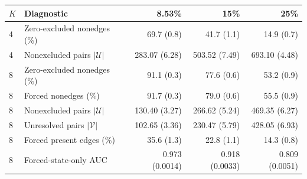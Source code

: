 \begin{tabular}{llrrr}
\toprule
$K$ & Diagnostic & 8.53\% & 15\% & 25\% \\
\midrule
4 & Zero-excluded nonedges (\%) & 69.7 (0.8) & 41.7 (1.1) & 14.9 (0.7) \\
4 & Nonexcluded pairs $|\mathcal U|$ & 283.07 (6.28) & 503.52 (7.49) & 693.10 (4.48) \\
\midrule
8 & Zero-excluded nonedges (\%) & 91.1 (0.3) & 77.6 (0.6) & 53.2 (0.9) \\
8 & Forced nonedges (\%) & 91.7 (0.3) & 79.0 (0.6) & 55.5 (0.9) \\
8 & Nonexcluded pairs $|\mathcal U|$ & 130.40 (3.27) & 266.62 (5.24) & 469.35 (6.27) \\
8 & Unresolved pairs $|\mathcal V|$ & 102.65 (3.36) & 230.47 (5.79) & 428.05 (6.93) \\
8 & Forced present edges (\%) & 35.6 (1.3) & 22.8 (1.1) & 14.3 (0.8) \\
8 & Forced-state-only AUC & 0.973 (0.0014) & 0.918 (0.0033) & 0.809 (0.0051) \\
\bottomrule
\end{tabular}
